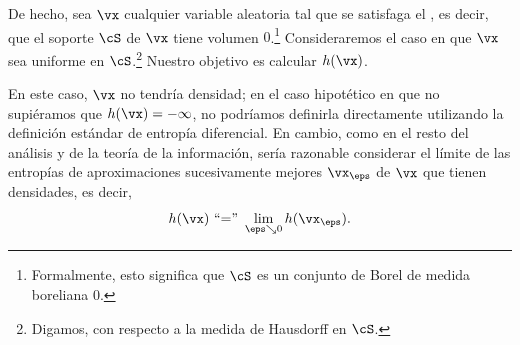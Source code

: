 \documentclass[../../book-main_es.tex]{subfiles}
\begin{document}
De hecho, sea \(\vx\) cualquier variable aleatoria tal que
se satisfaga el , es decir, que el soporte
\(\cS\) de \(\vx\) tiene volumen \(0\).\footnote{Formalmente, esto significa
que \(\cS\) es un conjunto de Borel de medida boreliana \(0\).} Consideraremos
el caso en que \(\vx\) sea uniforme en \(\cS\).\footnote{Digamos,
con respecto a la medida de Hausdorff en \(\cS\).} Nuestro objetivo es calcular \(h(\vx)\).

En este caso, \(\vx\) no tendría densidad; en el caso hipotético
en que no supiéramos que \(h(\vx) = -\infty\), no podríamos
definirla directamente utilizando la definición estándar de
entropía diferencial. En cambio, como en el resto del análisis y de la teoría de la información,
sería razonable considerar el límite de las entropías de 
aproximaciones sucesivamente mejores \(\vx_{\eps}\) de \(\vx\) que
tienen densidades, es decir,
\begin{equation}
    h(\vx)\ \text{``=''}\ \lim_{\eps \searrow 0}h(\vx_{\eps}).
\end{equation}
\end{document}
